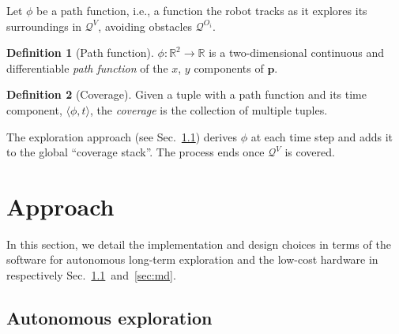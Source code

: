 \documentclass[lettersize,journal,twoside]{IEEEtran}
\theoremstyle{definition}
\newtheorem{defn}{Definition}[section]
\begin{document}
Let $\phi$ be a path function, i.e., a function the robot tracks as it explores its surroundings in $\mathcal{Q}^V$, avoiding %
obstacles $\mathcal{Q}^{O_i}$.

\begin{defn}[Path function]\label{def:pf}
  $\phi:\mathbb{R}^2\rightarrow\mathbb{R}$ is a two-dimensional continuous and differentiable \textit{path function} of the $x$, $y$ components of $\mathbf{p}$.
\end{defn}

\begin{defn}[Coverage]\label{def:co}
  Given a tuple with a path function and its time component, $\langle\phi,t\rangle$, the \textit{coverage} is the collection of multiple tuples.
\end{defn}

The %
exploration approach %
(see Sec.~\ref{sec:le}) derives $\phi$ at each time step and adds it to the global ``coverage stack''. The process ends once $\mathcal{Q}^V$ is covered.


\section{Approach}
\label{sec:m}
\noindent
In this section, we detail the implementation and design choices in terms of %
the software for autonomous long-term %
exploration and the low-cost hardware in respectively Sec.~\ref{sec:le}~and~\ref{sec:md}.

\subsection{Autonomous %
exploration}
\label{sec:le}
\end{document}
